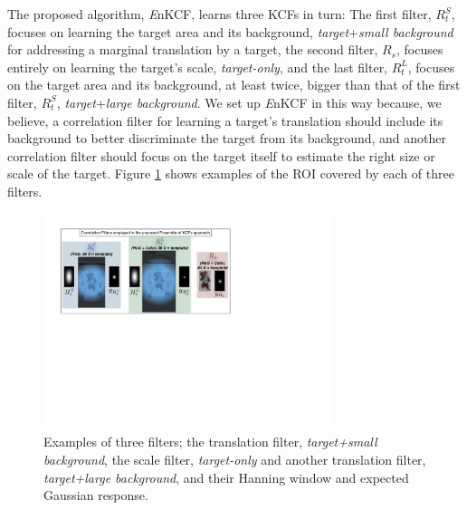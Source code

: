 \documentclass{bmvc2k}
\begin{document}
The proposed algorithm, {\it E}nKCF, learns three KCFs in turn: The
first filter, $R_{t}^{S}$, focuses on learning the target area and its
background, \textit{target}+\textit{small background} for addressing a
marginal translation by a target, the second filter, $R_{s}$, focuses
entirely on learning the target's scale, \textit{target-only}, and the
last filter, $R_{t}^{L}$, focuses on the target area and its
background, at least twice, bigger than that of the first filter,
$R_{t}^{S}$, \textit{target}+\textit{large background}. We set up {\it
  E}nKCF in this way because, we believe, a correlation filter for
learning a target's translation should include its background to
better discriminate the target from its background, and another
correlation filter should focus on the target itself to estimate the
right size or scale of the target. Figure \ref{fig:Filters} shows
examples of the ROI covered by each of three filters. 

\begin{figure}[!h]
\centering
\includegraphics[width=0.75\textwidth]{figures/Filters_Details.pdf}
\caption{Examples of three filters; the translation filter,
  \textit{target+small background}, the scale filter,
  \textit{target-only} and another translation filter,
  \textit{target+large background}, and their Hanning window and
  expected Gaussian response.}
\label{fig:Filters}
\end{figure}
\end{document}
